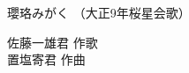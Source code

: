 \documentclass[10pt,b5j]{tarticle} %
\begin{document}
\begin{minipage}[c]{0.7\hsize} %
    \begin{center}
        {\LARGE
            瓔珞みがく %
        }
        {\small 
            （大正9年桜星会歌） %
        }
    \end{center}
\end{minipage}
\begin{minipage}[c]{0.3\hsize} %
    \begin{flushright} %
        佐藤一雄君 作歌\\置塩寄君 作曲 %
    \end{flushright}
\end{minipage}
\end{document}

